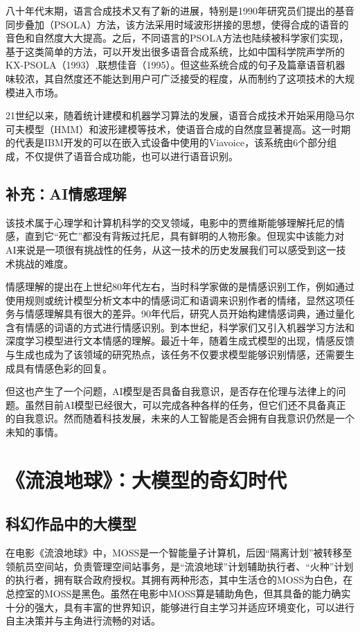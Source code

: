 八十年代末期，语言合成技术又有了新的进展，特别是1990年研究员们提出的基音同步叠加（PSOLA）方法，该方法采用时域波形拼接的思想，使得合成的语音的音色和自然度大大提高。之后，不同语言的PSOLA方法也陆续被科学家们实现，基于这类简单的方法，可以开发出很多语音合成系统，比如中国科学院声学所的KX-PSOLA（1993）,联想佳音（1995）。但这些系统合成的句子及篇章语音机器味较浓，其自然度还不能达到用户可广泛接受的程度，从而制约了这项技术的大规模进入市场。

21世纪以来，随着统计建模和机器学习算法的发展，语音合成技术开始采用隐马尔可夫模型（HMM）和波形建模等技术，使语音合成的自然度显著提高。这一时期的代表是IBM开发的可以在嵌入式设备中使用的Viavoice，该系统由6个部分组成，不仅提供了语音合成功能，也可以进行语音识别。

\subsection{补充：AI情感理解}

该技术属于心理学和计算机科学的交叉领域，电影中的贾维斯能够理解托尼的情感，直到它“死亡”都没有背叛过托尼，具有鲜明的人物形象。但现实中该能力对AI来说是一项很有挑战性的任务，从这一技术的历史发展我们可以感受到这一技术挑战的难度。

情感理解的提出在上世纪80年代左右，当时科学家做的是情感识别工作，例如通过使用规则或统计模型分析文本中的情感词汇和语调来识别作者的情绪，显然这项任务与情感理解具有很大的差异。90年代后，研究人员开始构建情感词典，通过量化含有情感的词语的方式进行情感识别。到本世纪，科学家们又引入机器学习方法和深度学习模型进行文本情感的理解。最近十年，随着生成式模型的出现，情感反馈与生成也成为了该领域的研究热点，该任务不仅要求模型能够识别情感，还需要生成具有情感色彩的回复。

但这也产生了一个问题，AI模型是否具备自我意识，是否存在伦理与法律上的问题。虽然目前AI模型已经很大，可以完成各种各样的任务，但它们还不具备真正的自我意识。然而随着科技发展，未来的人工智能是否会拥有自我意识仍然是一个未知的事情。

\section{《流浪地球》：大模型的奇幻时代}
\subsection{科幻作品中的大模型}

在电影《流浪地球》中，MOSS是一个智能量子计算机，后因“隔离计划”被转移至领航员空间站，负责管理空间站事务，是“流浪地球”计划辅助执行者、“火种”计划的执行者，拥有联合政府授权。其拥有两种形态，其中生活仓的MOSS为白色，在总控室的MOSS是黑色。虽然在电影中MOSS算是辅助角色，但其具备的能力确实十分的强大，具有丰富的世界知识，能够进行自主学习并适应环境变化，可以进行自主决策并与主角进行流畅的对话。

